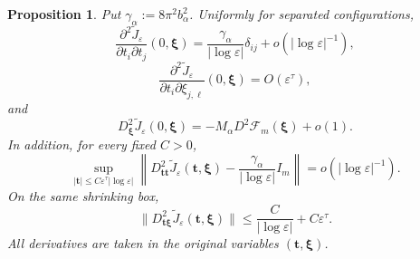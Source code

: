\documentclass[11pt]{article}
\newtheorem{proposition}[theorem]{Proposition}
\numberwithin{equation}{section}
\begin{document}
\begin{proposition}\label{prop:scale-Hessian}
Put $\gamma_\alpha:=8\pi^2b_\alpha^2$. Uniformly for separated
configurations,
\begin{equation}\label{eq:scale-Hessian}
\frac{\partial^2\widetilde J_\varepsilon}
{\partial t_i\partial t_j}(0,\boldsymbol\xi)
=\frac{\gamma_\alpha}{|\log\varepsilon|}\delta_{ij}
+o(|\log\varepsilon|^{-1}),
\end{equation}
\begin{equation}\label{eq:mixed-Hessian-zero-scale}
\frac{\partial^2\widetilde J_\varepsilon}
{\partial t_i\partial\xi_{j,\ell}}(0,\boldsymbol\xi)
=O(\varepsilon^\tau),
\end{equation}
and
\begin{equation}\label{eq:position-Hessian}
D_{\boldsymbol\xi}^2\widetilde J_\varepsilon(0,\boldsymbol\xi)
=-M_\alpha D^2\mathcal F_m(\boldsymbol\xi)+o(1).
\end{equation}
In addition, for every fixed $C>0$,
\begin{equation}\label{eq:uniform-scale-Hessian}
\sup_{|\boldsymbol t|\leq
C\varepsilon^\tau|\log\varepsilon|}
\left\|D_{\boldsymbol t\boldsymbol t}^2
\widetilde J_\varepsilon(\boldsymbol t,\boldsymbol\xi)
-\frac{\gamma_\alpha}{|\log\varepsilon|}I_m\right\|
=o(|\log\varepsilon|^{-1}).
\end{equation}
On the same shrinking box,
\begin{equation}\label{eq:mixed-Hessian}
\|D_{\boldsymbol t\boldsymbol\xi}^2
\widetilde J_\varepsilon(\boldsymbol t,\boldsymbol\xi)\|
\leq \frac{C}{|\log\varepsilon|}+C\varepsilon^\tau.
\end{equation}
All derivatives are taken in the original variables
$(\boldsymbol t,\boldsymbol\xi)$.
\end{proposition}
\end{document}
